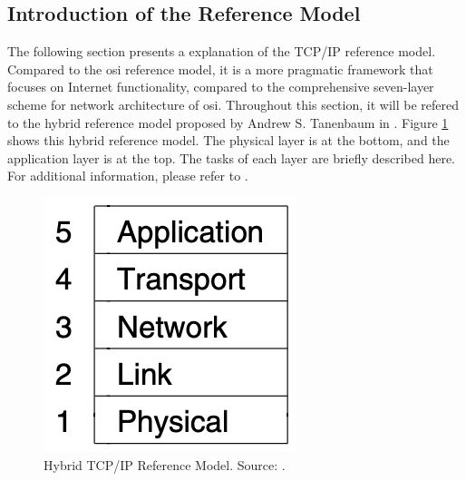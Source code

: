 \subsection{Introduction of the Reference Model}

The following section presents a explanation of the TCP/IP reference model. Compared to the \ac{osi} reference model, it is a more pragmatic framework that focuses on Internet functionality, compared to the comprehensive seven-layer scheme for network architecture of \ac{osi}. Throughout this section, it will be refered to the hybrid reference model proposed by Andrew S. Tanenbaum in \cite{Tanenbaum2010}. Figure \ref{fig:RefModel} shows this hybrid reference model. The physical layer is at the bottom, and the application layer is at the top. The tasks of each layer are briefly described here. For additional information, please refer to \cite{Tanenbaum2010}.

\begin{figure}[h]
    \centering
    \includegraphics[width=0.25\linewidth]{figures/tcpip_refmodel/image3.png}
    \caption[Hybrid TCP/IP Reference Model]{Hybrid TCP/IP Reference Model. Source: \cite{Tanenbaum2010}.}
    \label{fig:RefModel}
\end{figure}
	
